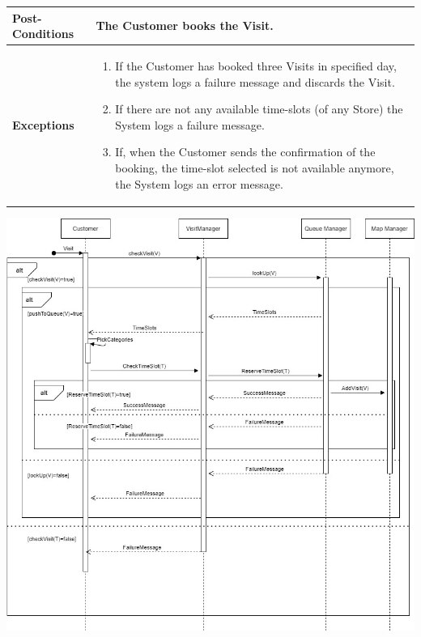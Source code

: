 \documentclass[a4paper, 10pt, oneside]{article}
\begin{document}
\begin{tabularx}{\linewidth}{| l | X |}
	\hline
	\textbf{Post-Conditions} & The Customer books the Visit.\\
	
	\hline
	\textbf{Exceptions} & \parbox{0.7\textwidth}{ \begin{enumerate}
			\item If the Customer has booked three Visits in specified day, the system logs a failure message and discards the Visit.
			\item If there are not any available time-slots (of any Store) the System logs a failure message.
			\item If, when the Customer sends the confirmation of the booking, the time-slot selected is not available anymore, the System logs an error message.
		\end{enumerate}}\\

	\hline
	
\end{tabularx}

\begin{minipage}{\linewidth}
            \centering
           \includegraphics[height=0.5\textheight, scale=1, keepaspectratio]{img/seq_diag/GetVisitD.jpg}
\end{minipage}
\end{document}
